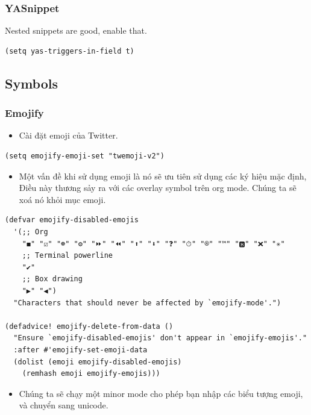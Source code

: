 \documentclass[11pt]{article}
\begin{document}
\subsubsection{YASnippet}
\label{sec:org2f5f951}
Nested snippets are good, enable that.

\begin{verbatim}
(setq yas-triggers-in-field t)
\end{verbatim}

\subsection{Symbols}
\label{sec:org29abd6a}
\subsubsection{Emojify}
\label{sec:org3589b8b}
\begin{itemize}
\item Cài đặt emoji của Twitter.
\end{itemize}

\begin{verbatim}
(setq emojify-emoji-set "twemoji-v2")
\end{verbatim}
\begin{itemize}
\item Một vấn đề khi sử dụng emoji là nó sẽ ưu tiên sử dụng các ký hiệu mặc định,
Điều này thương sảy ra với các overlay symbol trên org mode. Chúng ta sẽ xoá
nó khỏi mục emoji.
\end{itemize}

\begin{verbatim}
(defvar emojify-disabled-emojis
  '(;; Org
    "◼" "☑" "☸" "⚙" "⏩" "⏪" "⬆" "⬇" "❓" "⏱" "®" "™" "🅱" "❌" "✳"
    ;; Terminal powerline
    "✔"
    ;; Box drawing
    "▶" "◀")
  "Characters that should never be affected by `emojify-mode'.")

(defadvice! emojify-delete-from-data ()
  "Ensure `emojify-disabled-emojis' don't appear in `emojify-emojis'."
  :after #'emojify-set-emoji-data
  (dolist (emoji emojify-disabled-emojis)
    (remhash emoji emojify-emojis)))
\end{verbatim}

\begin{itemize}
\item Chúng ta sẽ chạy một minor mode cho phép bạn nhập các biểu tượng emoji, và
chuyển sang unicode.
\end{itemize}
\end{document}
